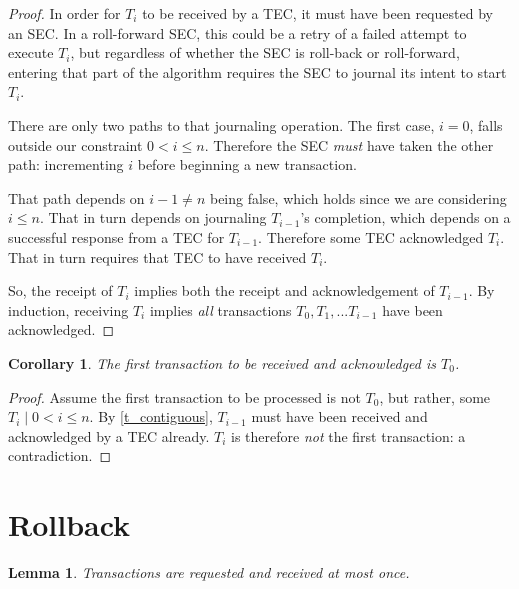 \documentclass{article}
\newtheorem{lemma}[theorem]{Lemma}
\newtheorem{corollary}{Corollary}[theorem]
\begin{document}
\begin{proof}

In order for $T_i$ to be received by a TEC, it must have been requested by an
SEC. In a roll-forward SEC, this could be a retry of a failed attempt to
execute $T_i$, but regardless of whether the SEC is roll-back or roll-forward,
entering that part of the algorithm requires the SEC to journal its intent to
start $T_i$.

There are only two paths to that journaling operation. The first case, $i = 0$,
falls outside our constraint $0 < i \le n$. Therefore the SEC \textit{must}
have taken the other path: incrementing $i$ before beginning a new transaction.

That path depends on $i - 1 \ne n$ being false, which holds since we are
considering $i \le n$. That in turn depends on journaling $T_{i-1}$'s
completion, which depends on a successful response from a TEC for $T_{i-1}$.
Therefore some TEC acknowledged $T_i$. That in turn requires that TEC to have
received $T_i$.

So, the receipt of $T_i$ implies both the receipt and acknowledgement of
$T_{i-1}$. By induction, receiving $T_i$ implies \textit{all} transactions
$T_0, T_1, ... T_{i-1}$ have been acknowledged.

\end{proof}


\begin{corollary}
\label{t_zero_first}
The first transaction to be received and acknowledged is $T_0$.
\end{corollary}

\begin{proof}
Assume the first transaction to be processed is not $T_0$, but rather, some
$T_i \mid 0 < i \le n$. By \ref{t_contiguous}, $T_{i-1}$ must have been
received and acknowledged by a TEC already. $T_i$ is therefore \textit{not} the
first transaction: a contradiction.
\end{proof}



\section{Rollback}

\begin{lemma}
\label{t_at_most_once}
Transactions are requested and received at most once.
\end{lemma}
\end{document}
